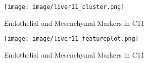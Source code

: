 \documentclass[lang=en]{elegantpaper}
\begin{document}
\begin{figure}[htbp]
    \begin{minipage}[htbp]{0.5\textwidth}
        \centering
        \texttt{[image: image/liver11\_cluster.png]}
        \caption{Endothelial and Mesenchymal Markers in C11 \label{11_clus}}
    \end{minipage}
    \begin{minipage}[htbp]{0.5\textwidth}
        \centering
        \texttt{[image: image/liver11\_featureplot.png]}
        \caption{Endothelial and Mesenchymal Markers in C11 \label{11_feat}}
    \end{minipage}
\end{figure}


\end{document}
